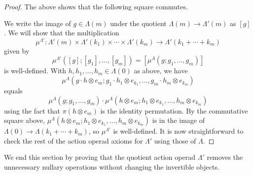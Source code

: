 \documentclass{amsbook} %
\numberwithin{section}{chapter}
\begin{document}
\begin{proof}
The above shows that the following square commutes.
\begin{center}
\end{center}	

We write the image of $g \in \Lambda(m)$ under the quotient $\Lambda(m) \rightarrow \Lambda'(m)$ as $[g]$. We will show that the multiplication
  \[
    \mu^{\Lambda'} \colon \Lambda'(m) \times \Lambda'(k_1) \times \cdots \times \Lambda'(k_m) \rightarrow \Lambda'(k_1 + \cdots + k_m)
  \]
given by 
  \[
    \mu^{\Lambda'}\left( [g]; [g_1], \ldots , [g_m] \right) = \left[\mu^{\Lambda}\left(g; g_1, \ldots, g_m \right)\right]
  \]
is well-defined. With $h, h_1, \ldots, h_m \in \Lambda(0)$ as above, we have
  \[
    \mu^{\Lambda}\left(g \cdot h \otimes e_m; g_1\cdot h_1 \otimes e_{k_1}, \ldots, g_m\cdot h_m \otimes e_{k_m} \right)
  \]
equals
  \[
    \mu^{\Lambda}(g; g_1, \ldots, g_m) \cdot \mu^{\Lambda}(h \otimes e_m; h_1 \otimes e_{k_1}, \ldots, h_m \otimes e_{k_m})
  \]
using the fact that $\pi(h \otimes e_m)$ is the identity permutation. By the commutative square above, $\mu^{\Lambda}(h \otimes e_m; h_1 \otimes e_{k_1}, \ldots, h_m \otimes e_{k_m})$ is in the image of $\Lambda(0) \rightarrow \Lambda(k_1 + \cdots + k_m)$, so $\mu^{\Lambda'}$ is well-defined. It is now straightforward to check the rest of the action operad axioms for $\Lambda'$ using those of $\Lambda$.
\end{proof}

We end this section by proving that the quotient action operad $\Lambda'$ removes the unnecessary nullary operations without changing the invertible objects.
\end{document}
